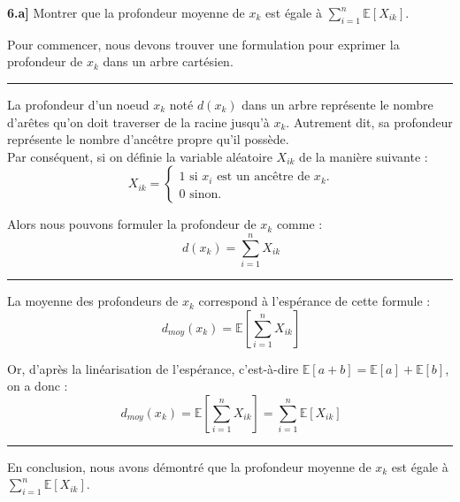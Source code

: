 \documentclass[a4paper,12pt]{report}
\begin{document}
\textbf{6.a]} Montrer que la profondeur moyenne de \( x_k \) est égale à \(\sum_{i = 1}^{n} \mathbb{E}[X_{ik}]\).



\begin{tcolorbox}[colback=gray!10, colframe=blue!30, coltitle=black, title=Réponse à la 6.a - 1/2]

    Pour commencer, nous devons trouver une formulation pour exprimer la profondeur de \( x_k \) dans un arbre cartésien.

    \vspace{0.5cm}
    \hrule
    \vspace{0.5cm}

    La profondeur d'un noeud \( x_k \) noté \( d(x_k) \) dans un arbre représente le nombre d'arêtes qu'on doit traverser de la racine jusqu'à \( x_k \). Autrement dit,
        sa profondeur représente le nombre d'ancêtre propre qu'il possède.\\

    Par conséquent, si on définie la variable aléatoire \( X_{ik} \) de la manière suivante :
    \[
    \ X_{ik} =
    \begin{cases}
        1 \text{ si \(x_i\) est un ancêtre de \(x_k\).} \\
        0 \text{ sinon.}
    \end{cases}
    \]

    \vspace{0.5cm}

    Alors nous pouvons formuler la profondeur de \( x_k \) comme :
    \[
    \ d(x_k) = \sum_{i=1}^{n} X_{ik}
    \]

    \vspace{0.5cm}
    \hrule
    \vspace{0.5cm}

    La moyenne des profondeurs de \( x_k \) correspond à l'espérance de cette formule :
    \[
    \ d_{moy}(x_k) = \mathbb{E}[\sum_{i = 1}^{n} X_{ik}]
    \]

\end{tcolorbox}
\begin{tcolorbox}[colback=gray!10, colframe=blue!30, coltitle=black, title=Réponse à la 6.a - 2/2]

    Or, d'après la linéarisation de l'espérance, c'est-à-dire \( \mathbb{E}[a+b] = \mathbb{E}[a] + \mathbb{E}[b] \), on a donc :
    \[
    \ d_{moy}(x_k) = \mathbb{E}[\sum_{i = 1}^{n} X_{ik}] = \sum_{i = 1}^{n} \mathbb{E}[X_{ik}]
    \]

    \vspace{0.5cm}
    \hrule
    \vspace{0.5cm}

    En conclusion, nous avons démontré que la profondeur moyenne de \( x_k \) est égale à \(\sum_{i = 1}^{n} \mathbb{E}[X_{ik}]\).

\end{tcolorbox}  
\end{document}
